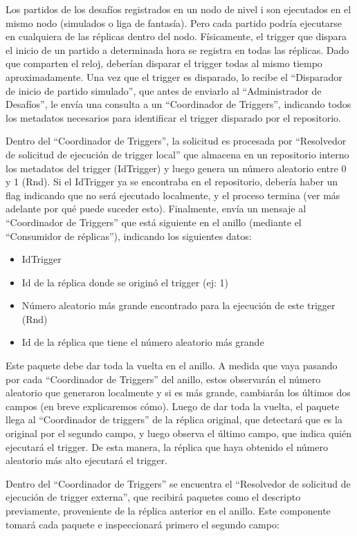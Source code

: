 Los partidos de los desafíos registrados en un nodo de nivel i son ejecutados en el mismo nodo (simulados o liga de fantasía). Pero cada partido podría ejecutarse en cualquiera de las réplicas dentro del nodo. Físicamente, el trigger que dispara el inicio de un partido a determinada hora se registra en todas las réplicas. Dado que comparten el reloj, deberían disparar el trigger todas al mismo tiempo aproximadamente. Una vez que el trigger es disparado, lo recibe el “Disparador de inicio de partido simulado”, que antes de enviarlo al “Administrador de Desafíos”, le envía una consulta a un “Coordinador de Triggers”, indicando todos los metadatos necesarios para identificar el trigger disparado por el repositorio.

Dentro del “Coordinador de Triggers”, la solicitud es procesada por “Resolvedor de solicitud de ejecución de trigger local” que almacena en un repositorio interno los metadatos del trigger (IdTrigger) y luego genera un número aleatorio entre 0 y 1 (Rnd). Si el IdTrigger ya se encontraba en el repositorio, debería haber un flag indicando que no será ejecutado localmente, y el proceso termina (ver más adelante por qué puede suceder esto). Finalmente, envía un mensaje al “Coordinador de Triggers” que está siguiente en el anillo (mediante el “Consumidor de réplicas”), indicando los siguientes datos:

\begin{itemize}
	\item IdTrigger
	\item Id de la réplica donde se originó el trigger (ej: 1)
	\item Número aleatorio más grande encontrado para la ejecución de este trigger (Rnd)
	\item Id de la réplica que tiene el número aleatorio más grande
\end{itemize}

Este paquete debe dar toda la vuelta en el anillo. A medida que vaya pasando por cada “Coordinador de Triggers” del anillo, estos observarán el número aleatorio que generaron localmente y si es más grande, cambiarán los últimos dos campos (en breve explicaremos cómo). Luego de dar toda la vuelta, el paquete llega al “Coordinador de triggers” de la réplica original, que detectará que es la original por el segundo campo, y luego observa el último campo, que indica quién ejecutará el trigger. De esta manera, la réplica que haya obtenido el número aleatorio más alto ejecutará el trigger.

Dentro del “Coordinador de Triggers” se encuentra el “Resolvedor de solicitud de ejecución de trigger externa”, que recibirá paquetes como el descripto previamente, proveniente de la réplica anterior en el anillo. Este componente tomará cada paquete e inspeccionará primero el segundo campo:

